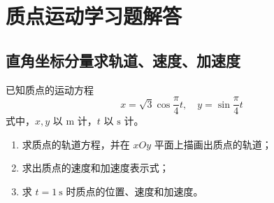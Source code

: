 \chapter{质点运动学习题解答}

\section{直角坐标分量求轨道、速度、加速度}
已知质点的运动方程
\[
x=\sqrt{3}\cos \frac{\pi}{4}t,\quad y=\sin \frac{\pi}{4}t
\]
式中，$x,y$ 以 $\mathrm{m}$ 计，$t$ 以 $\mathrm{s}$ 计。
\begin{enumerate}
    \item 求质点的轨道方程，并在 $xOy$ 平面上描画出质点的轨道；
    \item 求出质点的速度和加速度表示式；
    \item 求 $t=1\ \mathrm{s}$ 时质点的位置、速度和加速度。
\end{enumerate}

